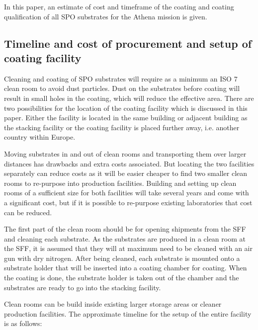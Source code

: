 In this paper, an estimate of cost and timeframe of the coating and coating qualification of all SPO substrates for the Athena mission is given.

\subsection{Timeline and cost of procurement and setup of coating facility}

Cleaning and coating of SPO substrates will require as a minimum an ISO 7 clean room to avoid dust particles. Dust on the substrates before coating will result in small holes in the coating, which will reduce the effective area. There are two possibilities for the location of the coating facility which is discussed in this paper. Either the facility is located in the same building or adjacent building as the stacking facility or the coating facility is placed further away, i.e. another country within Europe.

Moving substrates in and out of clean rooms and transporting them over larger distances has drawbacks and extra costs associated. But locating the two facilities separately can reduce costs as it will be easier cheaper to find two smaller clean rooms to re-purpose into production facilities. Building and setting up clean rooms of a sufficient size for both facilities will take several years and come with a significant cost, but if it is possible to re-purpose existing laboratories that cost can be reduced.

The first part of the clean room should be for opening shipments from the SFF and cleaning each substrate. As the substrates are produced in a clean room at the SFF, it is assumed that they will at maximum need to be cleaned with an air gun with dry nitrogen. After being cleaned, each substrate is mounted onto a substrate holder that will be inserted into a coating chamber for coating. When the coating is done, the substrate holder is taken out of the chamber and the substrates are ready to go into the stacking facility.

Clean rooms can be build inside existing larger storage areas or cleaner production facilities. The approximate timeline for the setup of the entire facility is as follows:

